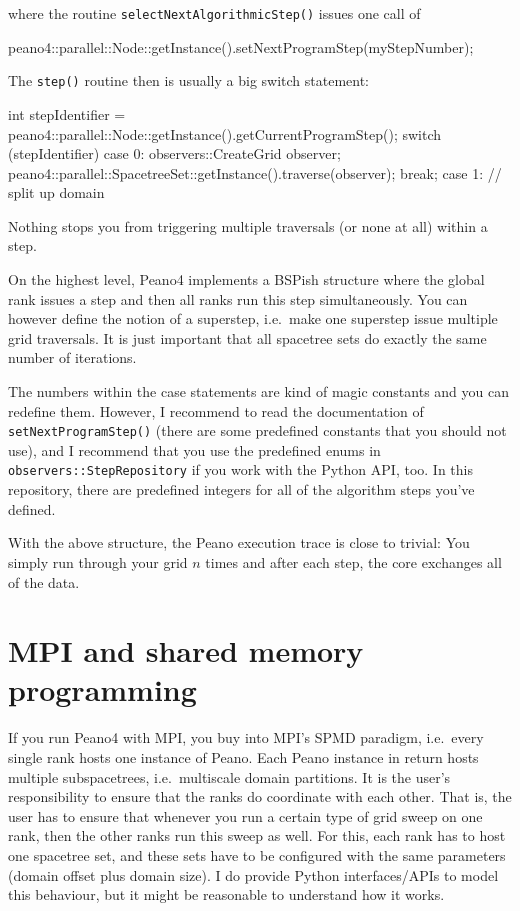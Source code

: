 \noindent
where the routine \texttt{selectNextAlgorithmicStep()} issues one call of
\begin{code}
peano4::parallel::Node::getInstance().setNextProgramStep(myStepNumber);
\end{code}

The \texttt{step()} routine then is usually a big switch statement:
\begin{code}
int stepIdentifier = peano4::parallel::Node::getInstance().getCurrentProgramStep();
switch (stepIdentifier) {
  case 0:
    {
      observers::CreateGrid  observer;
      peano4::parallel::SpacetreeSet::getInstance().traverse(observer);
    }
    break;
  case 1:
    {
      // split up domain
    }
}
\end{code}


\noindent
Nothing stops you from triggering multiple traversals (or none at all) within a
step.


\begin{remark}
 On the highest level, Peano4 implements a BSPish structure where the global
 rank issues a step and then all ranks run this step simultaneously. You can
 however define the notion of a superstep, i.e.~make one superstep issue
 multiple grid traversals. It is just important that all spacetree sets do
 exactly the same number of iterations.
\end{remark}


\noindent
The numbers within the case statements are kind of magic constants and you can
redefine them. 
However, I recommend to read the documentation of \texttt{setNextProgramStep()}
(there are some predefined constants that you should not use), and I recommend
that you use the predefined enums in \texttt{observers::StepRepository} if you
work with the Python API, too.
In this repository, there are predefined integers for all of the algorithm steps
you've defined. 


With the above structure, the Peano execution trace is close to trivial:
You simply run through your grid $n$ times and after each step, the core
exchanges all of the data.


\section*{MPI and shared memory programming}

If you run Peano4 with MPI, you buy into MPI's SPMD paradigm, i.e.~every single
rank hosts one instance of Peano.
Each Peano instance in return hosts multiple subspacetrees, i.e.~multiscale
domain partitions.
It is the user's responsibility to ensure that the ranks do coordinate with each
other.
That is, the user has to ensure that whenever you run a certain type of grid
sweep on one rank, then the other ranks run this sweep as well.
For this, each rank has to host one spacetree set, and these sets have to be
configured with the same parameters (domain offset plus domain size).
I do provide Python interfaces/APIs to model this behaviour, but it might be
reasonable to understand how it works.



